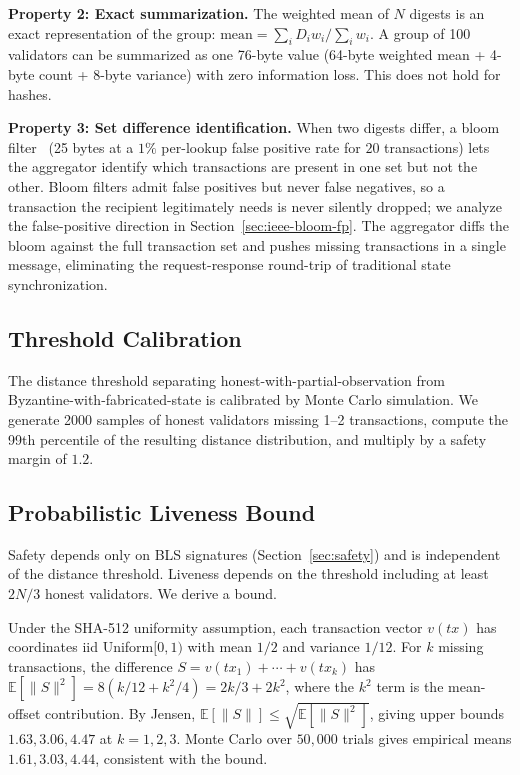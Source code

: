 \documentclass[conference]{IEEEtran}
\begin{document}
\textbf{Property 2: Exact summarization.} The weighted mean of $N$ digests is an exact representation of the group: $\mathrm{mean} = \sum_i D_i w_i / \sum_i w_i$. A group of 100 validators can be summarized as one 76-byte value (64-byte weighted mean + 4-byte count + 8-byte variance) with zero information loss. This does not hold for hashes.

\textbf{Property 3: Set difference identification.} When two digests differ, a bloom filter~\cite{bloom1970} (25 bytes at a $1\%$ per-lookup false positive rate for $20$ transactions) lets the aggregator identify which transactions are present in one set but not the other. Bloom filters admit false positives but never false negatives, so a transaction the recipient legitimately needs is never silently dropped; we analyze the false-positive direction in Section~\ref{sec:ieee-bloom-fp}. The aggregator diffs the bloom against the full transaction set and pushes missing transactions in a single message, eliminating the request-response round-trip of traditional state synchronization.

\subsection{Threshold Calibration}

The distance threshold separating honest-with-partial-observation from Byzantine-with-fabricated-state is calibrated by Monte Carlo simulation. We generate 2000 samples of honest validators missing 1--2 transactions, compute the 99th percentile of the resulting distance distribution, and multiply by a safety margin of $1.2$.

\subsection{Probabilistic Liveness Bound}
\label{sec:liveness-bound}

Safety depends only on BLS signatures (Section~\ref{sec:safety}) and is independent of the distance threshold. Liveness depends on the threshold including at least $2N/3$ honest validators. We derive a bound.

Under the SHA-512 uniformity assumption, each transaction vector $v(tx)$ has coordinates iid Uniform$[0,1)$ with mean $1/2$ and variance $1/12$. For $k$ missing transactions, the difference $S = v(tx_1) + \cdots + v(tx_k)$ has $\mathbb{E}[\|S\|^2] = 8(k/12 + k^2/4) = 2k/3 + 2k^2$, where the $k^2$ term is the mean-offset contribution. By Jensen, $\mathbb{E}[\|S\|] \le \sqrt{\mathbb{E}[\|S\|^2]}$, giving upper bounds $1.63, 3.06, 4.47$ at $k = 1, 2, 3$. Monte Carlo over $50{,}000$ trials gives empirical means $1.61, 3.03, 4.44$, consistent with the bound.
\end{document}
